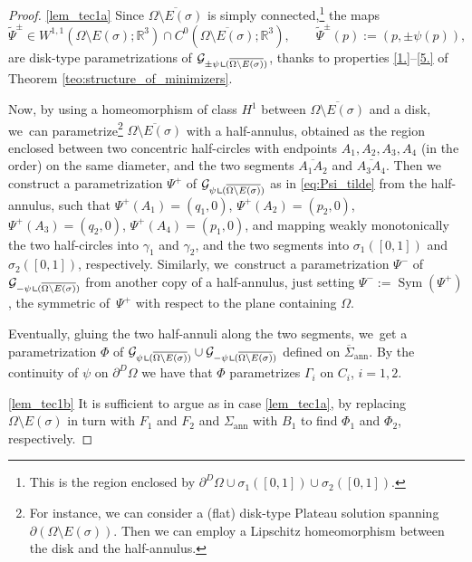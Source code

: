 \documentclass[11pt]{article}
\newcommand{\skpt}{\smallskip}
\numberwithin{equation}{section}
\DeclareMathOperator{\Sym}{Sym}
\newcommand{\R}{\mathbb{R}}
\let\Om\Omega
\newcommand{\openannulus}{\Sigma_\mathrm{ann}}
\newcommand{\resa}{\mathop{\hbox{\vrule height 7pt width 0.5pt depth 0pt
\vrule height 0.5pt width 6pt depth 0pt}}\nolimits}
\newcommand{\resb}{\mathop{\hbox{\vrule height 4pt width 0.5pt depth 0pt
\vrule height 0.5pt width 3pt depth 0pt}}\nolimits}
\newcommand{\res}{\mathchoice{\resa}{\resa}{\resb}{\resb}}
\theoremstyle{definition}
\begin{document}
\skpt
\begin{proof}
\ref{lem_tec1a}
Since $\overline{\Om\setminus E(\sigma)}$ is simply connected,\footnote{ This is the region enclosed by $\partial^D\Om\cup\sigma_1([0,1])\cup\sigma_2([0,1])$.} the
maps
\begin{equation}\label{eq:Psi_tilde}
\widetilde \Psi^\pm\in W^{1,1}({\Om\setminus E(\sigma)};\R^3)
\cap C^0(\overline{\Om\setminus E(\sigma)};\R^3),
\qquad \widetilde \Psi^\pm(p):=(p,\pm\psi(p)),
\end{equation}
are disk-type parametrizations of $\mathcal G_{\pm\psi\res (\overline{\Om\setminus E(\sigma)})}$, thanks to properties \ref{1.}--\ref{5.} of Theorem \ref{teo:structure_of_minimizers}.

Now, by using a homeomorphism of class $H^1$ between $\overline{\Om\setminus E(\sigma)}$ and a disk, we~can parametrize\footnote{For instance,
we can consider a (flat) disk-type Plateau solution
spanning $\partial(\Om\setminus E(\sigma))$.
Then we can employ a Lipschitz homeomorphism between the disk and the
half-annulus.}
$\overline{\Om\setminus E(\sigma)}$ with a half-annulus, obtained as the region enclosed between two concentric half-circles
with endpoints $A_1,A_2,A_3,A_4$ (in the order) on the same diameter, and the two segments $\overline{A_1A_2}$ and $\overline{A_3A_4}$.
Then we construct a parametrization $\Psi^+$
of $\mathcal G_{\psi\res (\overline{\Om\setminus E(\sigma)})}$ as in \eqref{eq:Psi_tilde} from the
half-annulus, such that $\Psi^+(A_1)=(q_1,0)$, $\Psi^+(A_2)=(p_2,0)$, $\Psi^+(A_3)=(q_2,0)$, $\Psi^+(A_4)=(p_1,0)$, and mapping weakly monotonically the two
half-circles
into $\gamma_1$ and $\gamma_2$, and the two segments into $\sigma_1([0,1])$ and
$\sigma_2([0,1])$, respectively.
Similarly, we~construct a parametrization $\Psi^-$ of $\mathcal G_{-\psi\res (\overline{\Om\setminus E(\sigma)})}$ from
another copy of a half-annulus, just
setting $\Psi^-:=\Sym(\Psi^+)$,
the symmetric of~$\Psi^+$ with respect to the plane containing $\Omega$.

Eventually, gluing the two half-annuli
along the two segments, we~get a parametrization $\Phi$
of $\mathcal G_{\psi\res (\overline{\Om\setminus E(\sigma)})}
\cup \mathcal G_{-\psi\res (\overline{\Om\setminus E(\sigma)})}$
defined on $\overline\Sigma_\mathrm{ann}$.
By the continuity of $\psi$ on $\partial^D\Omega$ we have that $ \Phi$ parametrizes $\Gamma_i$ on $C_i$, $i=1,2$.

\ref{lem_tec1b}
It is sufficient to argue as in case \ref{lem_tec1a},
by replacing $\Omega\setminus E(\sigma)$ in turn with $F_1$ and $F_2$ and
$\openannulus$ with $B_1$ to find $\Phi_1$ and $\Phi_2$, respectively.
\end{proof}
\end{document}
